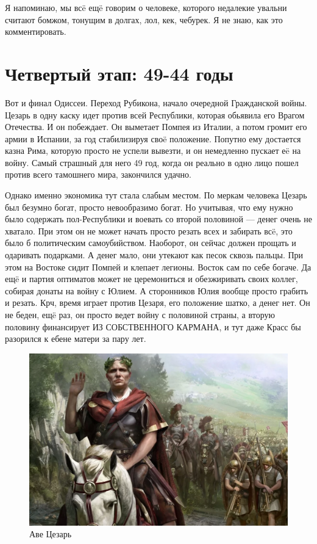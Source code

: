 \begin{remark}
	Я напоминаю, мы всë ещë говорим о человеке, которого недалекие увальни считают бомжом, тонущим в долгах, лол, кек, чебурек. Я не знаю, как это комментировать. 
\end{remark}

\section{Четвертый этап: 49-44 годы}

Вот и финал Одиссеи. Переход Рубикона, начало очередной Гражданской войны. Цезарь в одну каску идет против всей Республики, которая обьявила его Врагом Отечества. И он побеждает. Он выметает Помпея из Италии, а потом громит его армии в Испании, за год стабилизируя своë положение. Попутно ему достается казна Рима, которую просто не успели вывезти, и он немедленно пускает еë на войну. Самый страшный для него 49 год, когда он реально в одно лицо пошел против всего тамошнего мира, закончился удачно.


Однако именно экономика тут стала слабым местом. По меркам человека Цезарь был безумно богат, просто невообразимо богат. Но учитывая, что ему нужно было содержать пол-Республики и воевать со второй половиной — денег очень не хватало. При этом он не может начать просто резать всех и забирать всë, это было б политическим самоубийством. Наоборот, он сейчас должен прощать и одаривать подарками. А денег мало, они утекают как песок сквозь пальцы. При этом на Востоке сидит Помпей и клепает легионы. Восток сам по себе богаче. Да ещë и партия оптиматов может не церемониться и обезжиривать своих коллег, собирая донаты на войну с Юлием. А сторонников Юлия вообще просто грабить и резать. Крч, время играет против Цезаря, его положение шатко, а денег нет. Он не беден, ещë раз, он просто ведет войну с половиной страны, а вторую половину финансирует ИЗ СОБСТВЕННОГО КАРМАНА, и тут даже Красс бы разорился к ебене матери за пару лет. 

\begin{figure}[h!tb]
	\centering\includegraphics[scale=0.4]{Data/Caesar_and_money/16233343481189342.png}
	\caption{Аве Цезарь
	}
	\label{fig:ave} %
\end{figure}


